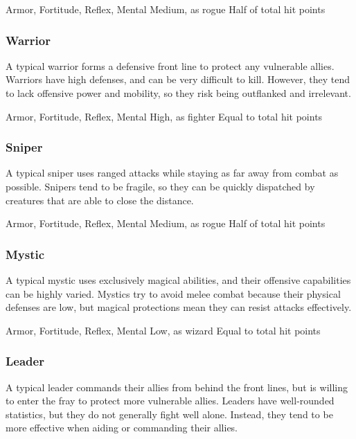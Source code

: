               Armor,  Fortitude,  Reflex,  Mental
             Medium, as rogue
             Half of total hit points

        \subsubsection{Warrior}
            A typical warrior forms a defensive front line to protect any vulnerable allies.
            Warriors have high defenses, and can be very difficult to kill.
            However, they tend to lack offensive power and mobility, so they risk being outflanked and irrelevant.

              Armor,  Fortitude,  Reflex,  Mental
             High, as fighter
             Equal to total hit points

        \subsubsection{Sniper}
            A typical sniper uses ranged attacks while staying as far away from combat as possible.
            Snipers tend to be fragile, so they can be quickly dispatched by creatures that are able to close the distance.

              Armor,  Fortitude,  Reflex,  Mental
             Medium, as rogue
             Half of total hit points

        \subsubsection{Mystic}
            A typical mystic uses exclusively magical abilities, and their offensive capabilities can be highly varied.
            Mystics try to avoid melee combat because their physical defenses are low, but magical protections mean they can resist attacks effectively.

              Armor,  Fortitude,  Reflex,  Mental
             Low, as wizard
             Equal to total hit points

        \subsubsection{Leader}
            A typical leader commands their allies from behind the front lines, but is willing to enter the fray to protect more vulnerable allies.
            Leaders have well-rounded statistics, but they do not generally fight well alone.
            Instead, they tend to be more effective when aiding or commanding their allies.

